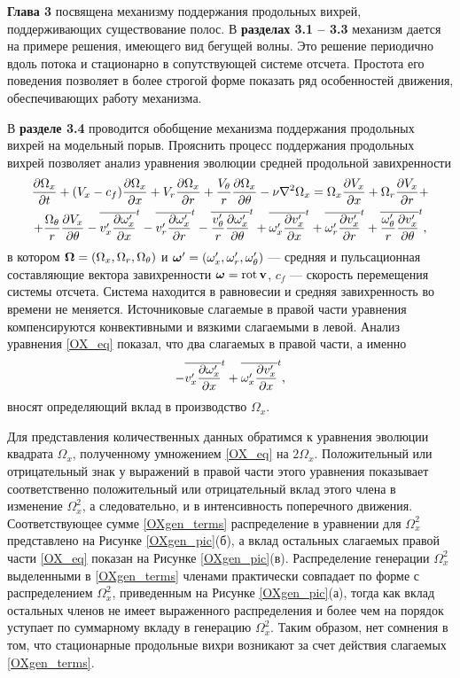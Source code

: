 \textbf{Глава 3} посвящена механизму поддержания продольных вихрей, поддерживающих существование полос. В \textbf{разделах 3.1 -- 3.3} механизм дается на примере решения, имеющего вид бегущей волны. Это решение периодично вдоль потока и стационарно в сопутствующей системе отсчета. Простота его поведения позволяет в более строгой форме показать ряд особенностей движения, обеспечивающих работу механизма. 

В \textbf{разделе 3.4} проводится обобщение механизма поддержания продольных вихрей на модельный порыв. 
Прояснить процесс поддержания продольных вихрей позволяет анализ уравнения эволюции средней продольной завихренности
\begin{multline}\label{OX_eq}
\frac{\partial \Omega_x}{\partial t} + (V_x - c_f)\frac{\partial \Omega_x}{\partial x} + V_r \frac{\partial \Omega_x}{\partial r} + \frac{V_\theta}{r} \frac{\partial \Omega_x}{\partial \theta} - \nu\nabla^2\Omega_x= \Omega_x \frac{\partial V_x}{\partial x} + \Omega_r \frac{\partial V_x}{\partial r} + \\ + \frac{\Omega_\theta}{r} \frac{\partial V_x}{\partial \theta}
 - \overline{v'_x \frac{\partial \omega'_x}{\partial x}}^t - \overline{v'_r \frac{\partial \omega'_x}{\partial r}}^t - \overline{\frac{v'_\theta}{r} \frac{\partial \omega'_x}{\partial \theta}}^t
 + \overline{\omega'_x \frac{\partial v'_x}{\partial x}}^t + \overline{\omega'_r \frac{\partial v'_x}{\partial r}}^t + \overline{\frac{\omega'_\theta}{r} \frac{\partial v'_x}{\partial \theta}}^t,
\end{multline}
в котором $\mbox{\boldmath$\Omega$} = (\Omega_x, \Omega_r, \Omega_\theta)$ и $\mbox{\boldmath$\omega$}' = (\omega'_x, \omega'_r, \omega'_\theta)$ --- средняя и пульсационная составляющие вектора завихренности $\mbox{\boldmath$\omega$} = \mathop{}\!\operatorname{rot} \mathbf{v}$, $c_f$ --- скорость перемещения системы отсчета. Система находится в равновесии и средняя завихренность во времени не меняется. Источниковые слагаемые в правой части уравнения компенсируются конвективными и вязкими слагаемыми в левой. Анализ уравнения \eqref{OX_eq} показал, что два слагаемых в правой части, а именно
\begin{equation}\label{OXgen_terms}
- \overline{v'_x \frac{\partial \omega'_x}{\partial x}}^t + \overline{ \omega'_x \frac{\partial v'_x}{\partial x} }^t,
\end{equation}
вносят определяющий вклад в производство $\Omega_x$. 

Для представления количественных данных обратимся к уравнения эволюции квадрата $\Omega_x$, полученному умножением \eqref{OX_eq} на $2\Omega_x$. Положительный или отрицательный знак у выражений в правой части этого уравнения показывает соответственно положительный или отрицательный вклад этого члена в изменение $\Omega^2_x$, а следовательно, и в интенсивность поперечного движения. Соответствующее сумме \eqref{OXgen_terms} распределение в уравнении для $\Omega^2_x$ представлено на Рисунке \ref{OXgen_pic}(б), а вклад остальных слагаемых правой части \eqref{OX_eq} показан на Рисунке \ref{OXgen_pic}(в). Распределение генерации $\Omega^2_x$ выделенными в \eqref{OXgen_terms} членами практически совпадает по форме с распределением $\Omega^2_x$, приведенным на Рисунке \ref{OXgen_pic}(а), тогда как вклад остальных членов не имеет выраженного распределения и более чем на порядок уступает по суммарному вкладу в генерацию $\Omega^2_x$. Таким образом, нет сомнения в том, что стационарные продольные вихри возникают за счет действия слагаемых \eqref{OXgen_terms}.


